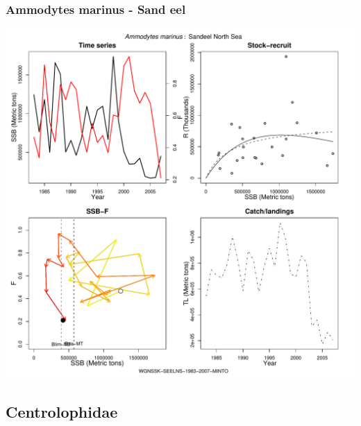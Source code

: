 \subsubsection{Ammodytes marinus - Sand eel}
\begin{center}
\includegraphics[width=1.2\textwidth]{../R/figures/WGNSSK-SEELNS-1983-2007-MINTO.pdf}
\end{center}

\subsection{Centrolophidae}

